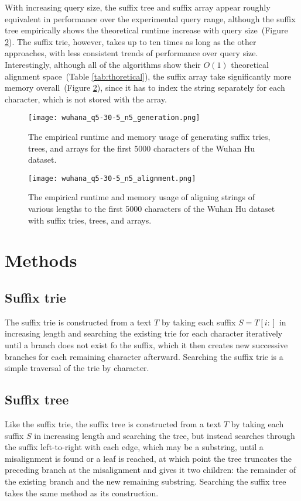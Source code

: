 \documentclass[11pt, letterpaper]{article}
\begin{document}
With increasing query size, the suffix tree and suffix array appear roughly equivalent in performance over the experimental query range, although the suffix tree empirically shows the theoretical runtime increase with query size~(Figure \ref{fig:alignment}). The suffix trie, however, takes up to ten times as long as the other approaches, with less consistent trends of performance over query size. Interestingly, although all of the algorithms show their $O(1)$ theoretical alignment space~(Table \ref{tab:thoretical}), the suffix array take significantly more memory overall~(Figure \ref{fig:alignment}), since it has to index the string separately for each character, which is not stored with the array.


\begin{figure}[h] \centering
    \texttt{[image: wuhana\_q5-30-5\_n5\_generation.png]}
    \caption{The empirical runtime and memory usage of generating suffix tries, trees, and arrays for the first 5000 characters of the Wuhan Hu dataset.}
    \label{fig:generation}
\end{figure}

\begin{figure}[h] \centering
    \texttt{[image: wuhana\_q5-30-5\_n5\_alignment.png]}
    \caption{The empirical runtime and memory usage of aligning strings of various lengths to the first 5000 characters of the Wuhan Hu dataset with suffix tries, trees, and arrays.}
    \label{fig:alignment}
\end{figure}


\section{Methods}

\subsection{Suffix trie}
The suffix trie is constructed from a text $T$ by taking each suffix $S=T[i:]$ in increasing length and searching the existing trie for each character iteratively until a branch does not exist fo the suffix, which it then creates new successive branches for each remaining character afterward. Searching the suffix trie is a simple traversal of the trie by character.

\subsection{Suffix tree}
Like the suffix trie, the suffix tree is constructed from a text $T$ by taking each suffix $S$ in increasing length and searching the tree, but instead searches through the suffix left-to-right with each edge, which may be a substring, until a misalignment is found or a leaf is reached, at which point the tree truncates the preceding branch at the misalignment and gives it two children: the remainder of the existing branch and the new remaining substring. Searching the suffix tree takes the same method as its construction.
\end{document}
